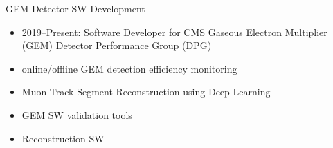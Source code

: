 \makeatletter
  \graphicspath{ {@path} }
\makeatother

\begin{frame}[fragile]{GEM Detector SW Development}
  \begin{itemize}
    \item 2019–Present: Software Developer for CMS Gaseous Electron Multiplier (GEM) Detector Performance Group (DPG)
    \item online/offline GEM detection efficiency monitoring
    \item Muon Track Segment Reconstruction using Deep Learning
    \item GEM SW validation tools
    \item Reconstruction SW
  \end{itemize}
\end{frame}
